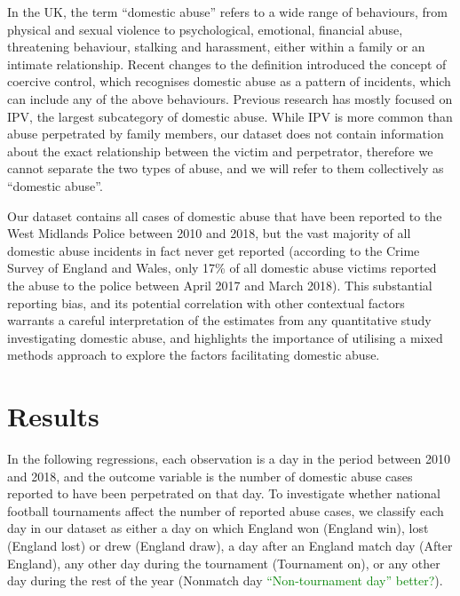 \documentclass[12pt, letterpaper]{article}
\newcommand{\NS}[1] {{\textcolor{green}{#1}}}
\begin{document}
In the UK, the term ``domestic abuse'' refers to a wide range of behaviours, from physical and sexual violence to psychological, emotional, financial abuse, threatening behaviour, stalking and harassment, either within a family or an intimate relationship\autocite{ONS}. Recent changes to the definition introduced the concept of coercive control, which recognises domestic abuse as a pattern of incidents, which can include any of the above behaviours. Previous research has mostly focused on IPV, the largest subcategory of domestic abuse. While IPV is more common than abuse perpetrated by family members\autocite{ONS}, our dataset does not contain information about the exact relationship between the victim and perpetrator, therefore we cannot separate the two types of abuse, and we will refer to them collectively as ``domestic abuse''.


Our dataset contains all cases of domestic abuse that have been reported to the West Midlands Police between 2010 and 2018, but the vast majority of all domestic abuse incidents in fact never get reported (according to the Crime Survey of England and Wales, only 17\% of all domestic abuse victims reported the abuse to the police between April 2017 and March 2018\autocite{ONS}). This substantial reporting bias, and its potential correlation with other contextual factors warrants a careful interpretation of the estimates from any quantitative study investigating domestic abuse, and highlights the importance of utilising a mixed methods approach to explore the factors facilitating domestic abuse. 


\newpage



\section*{Results}

In the following regressions, each observation is a day in the period between 2010 and 2018, and the outcome variable is the number of domestic abuse cases reported to have been perpetrated on that day. To investigate whether national football tournaments affect the number of reported abuse cases, we classify each day in our dataset as either a day on which England won (England win), lost (England lost) or drew (England draw), a day after an England match day (After England), any other day during the tournament (Tournament on), or any other day during the rest of the year (Nonmatch day \NS{``Non-tournament day'' better?}). 
\end{document}
